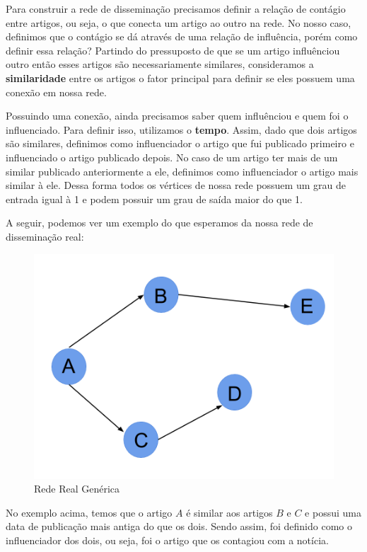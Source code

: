 \documentclass[a4paper,12pt]{article}
\begin{document}
Para construir a rede de disseminação precisamos definir a relação de contágio entre artigos, ou seja, o que conecta um artigo ao outro 
na rede. No nosso caso, definimos que o contágio se dá através de uma relação de influência, porém como definir essa relação? Partindo do
pressuposto de que se um artigo influênciou outro então esses artigos são necessariamente similares, consideramos a \textbf{similaridade}
entre os artigos o fator principal para definir se eles possuem uma conexão em nossa rede.

Possuindo uma conexão, ainda precisamos saber quem influênciou e quem foi o influenciado. Para definir isso, utilizamos o \textbf{tempo}.
Assim, dado que dois artigos são similares, definimos como influenciador o artigo que fui publicado primeiro e influenciado o artigo publicado
depois. No caso de um artigo ter mais de um similar publicado anteriormente a ele, definimos como influenciador o artigo
mais similar à ele. Dessa forma todos os vértices de nossa rede possuem um grau de entrada igual à 1 e podem possuir um grau de saída maior
do que 1.

A seguir, podemos ver um exemplo do que esperamos da nossa rede de disseminação real:


\begin{figure}[h]
 \centering
 \includegraphics[scale=0.2]{./rede1.png}
 \caption{Rede Real Genérica}
\end{figure}

No exemplo acima, temos que o artigo $A$ é similar aos artigos $B$ e $C$ e possui uma data de publicação mais antiga do que os dois. 
Sendo assim, foi definido como o influenciador dos dois, ou seja, foi o artigo que os contagiou com a notícia.
\end{document}
